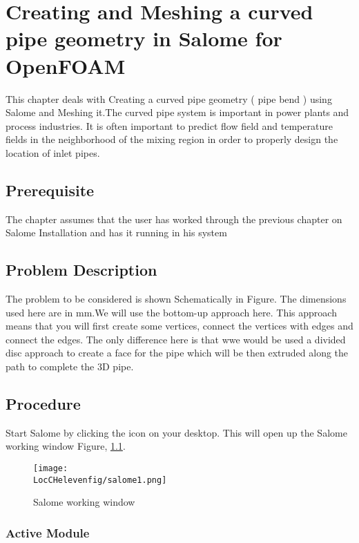 \chapter{Creating and Meshing a curved pipe geometry in Salome for OpenFOAM}
\thispagestyle{empty}
\label{sec:chap11}
\newcommand{\LocCHelevenfig}{\Origin/CHAPTERS/chap11/figures}

This chapter deals with Creating a curved pipe geometry ( pipe bend ) using Salome and Meshing it.The curved pipe system is important in power plants and process industries. It is often important to predict flow field and temperature fields in the neighborhood of the mixing region in order to properly design the location of inlet pipes.

\section{Prerequisite}
The chapter assumes that the user has worked through the previous chapter on Salome Installation and has it running in his system

\section{Problem Description}

The problem to be considered is shown Schematically in Figure. The dimensions used here are in mm.We will use the bottom-up approach here. This approach means that you will first create some vertices, connect the vertices with edges and connect the edges. The only difference here is that wwe would be used a divided disc approach to create a face for the pipe which will be then extruded along the path to complete the 3D pipe.

\section{Procedure}

Start Salome by clicking the icon on your desktop. This will open up the Salome working window Figure, \ref{salome}. \newline

\begin{figure}[h]  
\centering
\texttt{[image: \\LocCHelevenfig/salome1.png]}
\caption{Salome working window}
\label{salome}
\end{figure}

\subsection*{Active Module}

